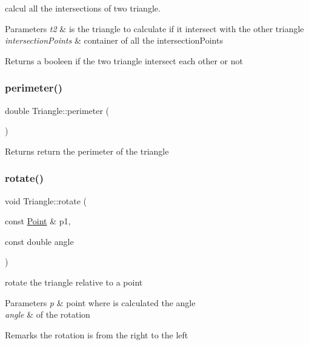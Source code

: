 calcul all the intersections of two triangle. 


\begin{DoxyParams}{Parameters}
{\em t2} & is the triangle to calculate if it intersect with the other triangle \\
\hline
{\em intersection\+Points} & container of all the intersection\+Points \\
\hline
\end{DoxyParams}
\begin{DoxyReturn}{Returns}
a booleen if the two triangle intersect each other or not 
\end{DoxyReturn}
\hypertarget{class_triangle_ae329043e5e9e59c486358dad75b1f1c2}{}\label{class_triangle_ae329043e5e9e59c486358dad75b1f1c2} 
\subsubsection{\texorpdfstring{perimeter()}{perimeter()}}
{\footnotesize\ttfamily double Triangle\+::perimeter (\begin{DoxyParamCaption}{ }\end{DoxyParamCaption})}

\begin{DoxyReturn}{Returns}
return the perimeter of the triangle 
\end{DoxyReturn}
\hypertarget{class_triangle_abc634b2ea1963e233b13dcd66009ec8d}{}\label{class_triangle_abc634b2ea1963e233b13dcd66009ec8d} 
\subsubsection{\texorpdfstring{rotate()}{rotate()}}
{\footnotesize\ttfamily void Triangle\+::rotate (\begin{DoxyParamCaption}\item[{const \hyperlink{class_point}{Point} \&}]{p1,  }\item[{const double}]{angle }\end{DoxyParamCaption})}



rotate the triangle relative to a point 


\begin{DoxyParams}{Parameters}
{\em p} & point where is calculated the angle \\
\hline
{\em angle} & of the rotation \\
\hline
\end{DoxyParams}
\begin{DoxyRemark}{Remarks}
the rotation is from the right to the left 
\end{DoxyRemark}
\hypertarget{class_triangle_ab7b89a40466185cdddbccf9a86ba4fa8}{}\label{class_triangle_ab7b89a40466185cdddbccf9a86ba4fa8} 
